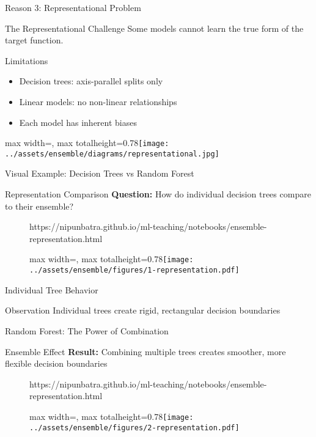 \documentclass[10pt]{beamer}
\newcommand{\fitpic}[1]{\begin{adjustbox}{max width=\linewidth, max totalheight=0.78\textheight}#1\end{adjustbox}}
\begin{document}
\begin{frame}{Reason 3: Representational Problem}
\begin{definitionbox}{The Representational Challenge}
Some models cannot learn the true form of the target function.
\end{definitionbox}

\begin{examplebox}{Limitations}
\begin{itemize}
\item Decision trees: axis-parallel splits only
\item Linear models: no non-linear relationships
\item Each model has inherent biases
\end{itemize}
\end{examplebox}

\begin{center}
\fitpic{\texttt{[image: ../assets/ensemble/diagrams/representational.jpg]}}
\end{center}
\end{frame}

\begin{frame}{Visual Example: Decision Trees vs Random Forest}
\begin{alertbox}{Representation Comparison}
\textbf{Question:} How do individual decision trees compare to their ensemble?
\end{alertbox}

\begin{figure}[htp]
  \centering
  \begin{notebookbox}{https://nipunbatra.github.io/ml-teaching/notebooks/ensemble-representation.html}
    \fitpic{\texttt{[image: ../assets/ensemble/figures/1-representation.pdf]}}
  \end{notebookbox}
\end{figure}
\end{frame}

\begin{frame}{Individual Tree Behavior}
\begin{keypointsbox}{Observation} 
  Individual trees create rigid, rectangular decision boundaries
\end{keypointsbox}
\end{frame}

\begin{frame}{Random Forest: The Power of Combination}
\begin{examplebox}{Ensemble Effect}
\textbf{Result:} Combining multiple trees creates smoother, more flexible decision boundaries
\end{examplebox}

  \begin{figure}[htp]
    \centering
    \begin{notebookbox}{https://nipunbatra.github.io/ml-teaching/notebooks/ensemble-representation.html}
      \fitpic{\texttt{[image: ../assets/ensemble/figures/2-representation.pdf]}}
    \end{notebookbox}
  \end{figure}
\end{frame}
  
\end{document}
